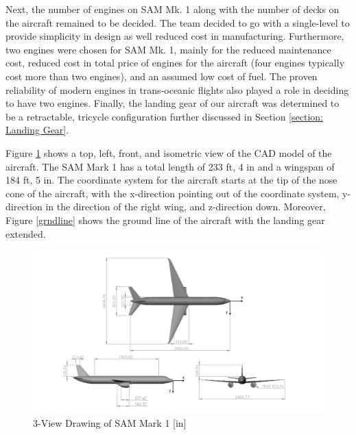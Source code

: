 Next, the number of engines on SAM Mk. 1 along with the number of decks on the aircraft remained to be decided. The team decided to go with a single-level to provide simplicity in design as well reduced cost in manufacturing. Furthermore, two engines were chosen for SAM Mk. 1, mainly for the reduced maintenance cost, reduced cost in total price of engines for the aircraft (four engines typically cost more than two engines), and an assumed low cost of fuel. The proven reliability of modern engines in trans-oceanic flights also played a role in deciding to have two engines. Finally, the landing gear of our aircraft was determined to be a retractable, tricycle configuration further discussed in Section \ref{section: Landing Gear}. 

Figure \ref{fig:threeview} shows a top, left, front, and isometric view of the CAD model of the aircraft. The SAM Mark 1 has a total length of 233 ft, 4 in and a wingspan of 184 ft, 5 in. The coordinate system for the aircraft starts at the tip of the nose cone of the aircraft, with the x-direction pointing out of the coordinate system, y-direction in the direction of the right wing, and z-direction down. Moreover, Figure \ref{grndline} shows the ground line of the aircraft with the landing gear extended.

\newpage

\begin{figure}[H]
    \centering
    \includegraphics[width=1.4\linewidth, angle =90 ]{Photos/3-view_with_coords.pdf}
    \caption{3-View Drawing of SAM Mark 1 [in]}
    \label{fig:threeview}
\end{figure}
\clearpage

